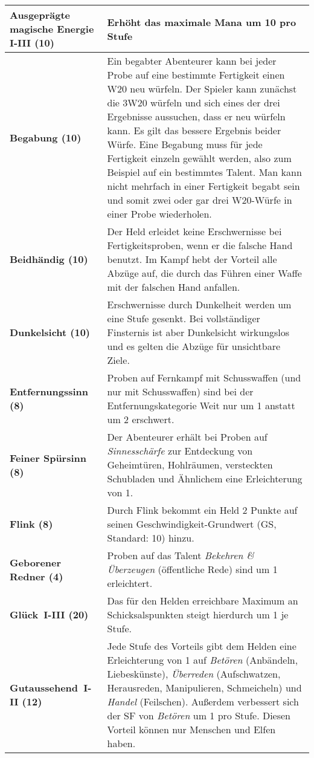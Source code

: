 \begin{longtable}{|p{5cm}|p{11cm}|}
\textbf{Ausgeprägte magische Energie I-III (10)} & Erhöht das maximale Mana um 10 pro Stufe \\ \hline

\textbf{Begabung (10)} & Ein begabter Abenteurer kann bei jeder Probe auf eine bestimmte Fertigkeit einen W20 neu würfeln. Der Spieler kann zunächst die 3W20 würfeln und sich eines der drei Ergebnisse aussuchen, dass er neu würfeln kann. Es gilt das bessere Ergebnis beider Würfe. Eine Begabung muss für jede Fertigkeit einzeln gewählt werden, also zum Beispiel auf ein bestimmtes Talent. Man kann nicht mehrfach in einer Fertigkeit begabt sein und somit zwei oder gar drei W20-Würfe in einer Probe wiederholen. \\ \hline

\textbf{Beidhändig (10)} & Der Held erleidet keine Erschwernisse bei Fertigkeitsproben, wenn er die falsche Hand benutzt. Im Kampf hebt der Vorteil alle Abzüge auf, die durch das Führen einer Waffe mit der falschen Hand anfallen. \\ \hline

\textbf{Dunkelsicht (10)} & Erschwernisse durch Dunkelheit werden um eine Stufe gesenkt. Bei vollständiger Finsternis ist aber Dunkelsicht wirkungslos und es gelten die Abzüge für unsichtbare Ziele. \\ \hline

\textbf{Entfernungssinn (8)} & Proben auf Fernkampf mit Schusswaffen (und nur mit Schusswaffen) sind bei der Entfernungskategorie Weit nur um 1 anstatt um 2 erschwert. \\ \hline

\textbf{Feiner Spürsinn (8)} & Der Abenteurer erhält bei Proben auf \textit{Sinnesschärfe} zur Entdeckung von Geheimtüren, Hohlräumen, versteckten Schubladen und Ähnlichem eine Erleichterung von 1. \\ \hline

\textbf{Flink (8)} & Durch Flink bekommt ein Held 2 Punkte auf seinen Geschwindigkeit-Grundwert (GS, Standard: 10) hinzu. \\ \hline

\textbf{Geborener Redner (4)} & Proben auf das Talent \textit{Bekehren \& Überzeugen} (öffentliche Rede) sind um 1 erleichtert. \\ \hline

\textbf{Glück~I-III (20)} & Das für den Helden erreichbare Maximum an Schicksalspunkten steigt hierdurch um 1 je Stufe. \\ \hline

\textbf{Gutaussehend~I-II (12)} & Jede Stufe des Vorteils gibt dem Helden eine Erleichterung von 1 auf \textit{Betören} (Anbändeln, Liebeskünste), \textit{Überreden} (Aufschwatzen, Herausreden, Manipulieren, Schmeicheln) und \textit{Handel} (Feilschen). Außerdem verbessert sich der SF von \textit{Betören} um 1 pro Stufe. Diesen Vorteil können nur Menschen und Elfen haben. \\ \hline


\end{longtable}
